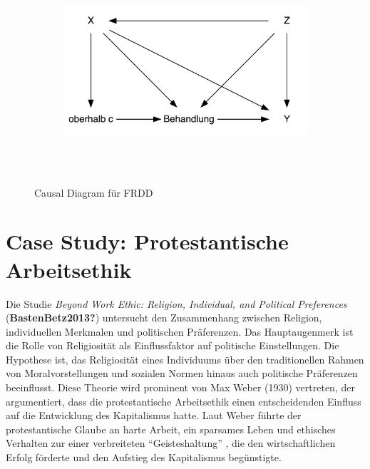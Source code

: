 \documentclass[
  letterpaper,
  DIV=11,
  oneside]{scrreprt}
\begin{document}
\begin{figure}

{\centering 

\begin{figure}[H]

{\centering \includegraphics[width=5in,height=3in]{RDD_files/figure-latex/dot-figure-2.png}

}

\end{figure}

}

\caption{\label{fig-CDFRDD}Causal Diagram für FRDD}

\end{figure}

\hypertarget{case-study-protestantische-arbeitsethik}{%
\section{Case Study: Protestantische
Arbeitsethik}\label{case-study-protestantische-arbeitsethik}}

Die Studie \emph{Beyond Work Ethic: Religion, Individual, and Political
Preferences} (\textbf{BastenBetz2013?}) untersucht den Zusammenhang
zwischen Religion, individuellen Merkmalen und politischen Präferenzen.
Das Hauptaugenmerk ist die Rolle von Religiosität als Einflussfaktor auf
politische Einstellungen. Die Hypothese ist, das Religiosität eines
Individuums über den traditionellen Rahmen von Moralvorstellungen und
sozialen Normen hinaus auch politische Präferenzen beeinflusst. Diese
Theorie wird prominent von Max Weber (1930) vertreten, der argumentiert,
dass die protestantische Arbeitsethik einen entscheidenden Einfluss auf
die Entwicklung des Kapitalismus hatte. Laut Weber führte der
protestantische Glaube an harte Arbeit, ein sparsames Leben und
ethisches Verhalten zur einer verbreiteten ``Geisteshaltung'' , die den
wirtschaftlichen Erfolg förderte und den Aufstieg des Kapitalismus
begünstigte.
\end{document}
